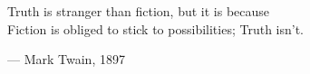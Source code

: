 \begin{flushright}
\begin{hangleftquote}{\QENOpen}{\QENClose}
Truth is stranger than fiction, but it is because\\
Fiction is obliged to stick to possibilities; Truth isn't.
\end{hangleftquote}
\par\smallskip
\normalfont — Mark Twain, 1897
\end{flushright}

